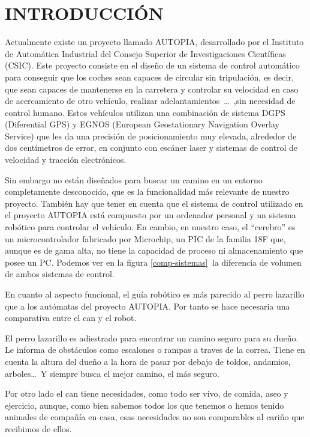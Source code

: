 \chapter{INTRODUCCIÓN}

Actualmente existe un proyecto llamado AUTOPIA, desarrollado por el Instituto de Automática Industrial del Consejo Superior de Investigaciones Cien\-tí\-fi\-cas (CSIC)\cite{web:autopia}. Este proyecto consiste en el diseño de un sistema de control automático para conseguir que los coches sean capaces de circular sin tripulación, es decir, que sean capaces de mantenerse en la carretera y controlar su velocidad en caso de acercamiento de otro vehículo, realizar adelantamientos~\dots \ ,sin necesidad de control humano. Estos vehículos utilizan una combinación de sistema DGPS (Diferential GPS) y EGNOS (European Geostationary Navigation Overlay Service) que les da una precisión de posicionamiento muy elevada, alrededor de dos centímetros de error, en conjunto con escáner laser y sistemas de control de velocidad y tracción electrónicos.\par
Sin embargo no están diseñados para buscar un camino en un entorno completamente desconocido, que es la funcionalidad más relevante de nuestro proyecto. También hay que tener en cuenta que el sistema de control utilizado en el proyecto AUTOPIA está compuesto por un ordenador personal y un sistema robótico para controlar el vehículo. En cambio, en nuestro caso, el ``cerebro'' es un microcontrolador fabricado por Microchip, un PIC de la familia 18F que, aunque es de gama alta, no tiene la capacidad de proceso ni almacenamiento que posee un PC. Podemos ver en la figura \ref{comp-sistemas}\ la diferencia de volumen de ambos sistemas de control.\par
{}
\par
En cuanto al aspecto funcional, el guía robótico es más parecido al perro lazarillo que a los autómatas del proyecto AUTOPIA. Por tanto se hace necesaria una comparativa entre el can y el robot.\par
El perro lazarillo es adiestrado para encontrar un camino seguro para su dueño. Le informa de obstáculos como escalones o rampas a traves de la correa. Tiene en cuenta la altura del dueño a la hora de pasar por debajo de toldos, andamios, arboles\dots \ Y siempre busca el mejor camino, el más seguro.\par
Por otro lado el can tiene necesidades, como todo ser vivo, de comida, aseo y ejercicio, aunque, como bien sabemos todos los que tenemos o hemos tenido animales de compañía en casa, esas necesidades no son comparables al cariño que recibimos de ellos.\par
